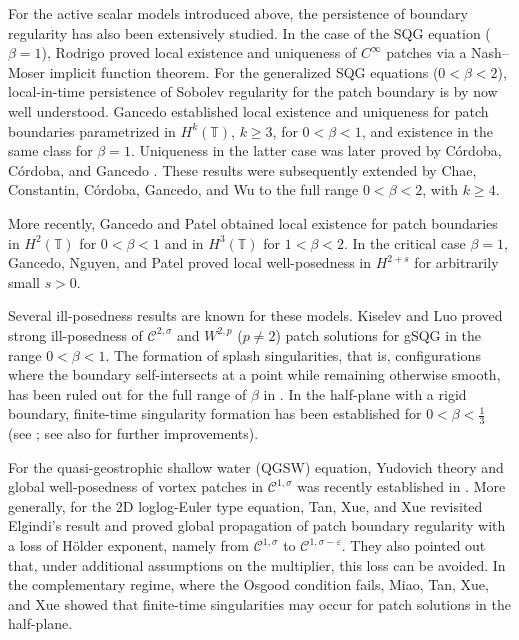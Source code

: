 \documentclass[a4paper]{amsart}
\theoremstyle{definition}
\newcommand{\T}{\ensuremath{\mathbb{T}}}
\newcommand{\Lipa}[1][\gamma]{\ensuremath{\mathcal{C}^#1}}
\newcommand{\LipUa}[1][\gamma]{\ensuremath{\Lipa[{{1,#1}}]}}
\begin{document}
For the active scalar models introduced above, the persistence of boundary regularity has also been extensively studied. In the case of the SQG equation (\(\beta=1\)), Rodrigo \cite{rodrigo2005} proved local existence and uniqueness of \(C^\infty\) patches via a Nash--Moser implicit function theorem. For the generalized SQG equations (\(0<\beta<2\)), local-in-time persistence of Sobolev regularity for the patch boundary is by now well understood. Gancedo \cite{gancedo2008SQG} established local existence and uniqueness for patch boundaries parametrized in \(H^k(\T)\), \(k \geq 3\), for \(0<\beta<1\), and existence in the same class for \(\beta=1\). Uniqueness in the latter case was later proved by Córdoba, Córdoba, and Gancedo \cite{GancedoUniquenessSQG}. These results were subsequently extended by Chae, Constantin, Córdoba, Gancedo, and Wu \cite{chae2012generalized} to the full range \(0<\beta<2\), with \(k \geq 4\).

More recently, Gancedo and Patel \cite{gancedo2021local} obtained local existence for patch boundaries in \(H^2(\T)\) for \(0<\beta<1\) and in \(H^3(\T)\) for \(1<\beta<2\). In the critical case \(\beta=1\), Gancedo, Nguyen, and Patel \cite{GNP22} proved local well-posedness in \(H^{2+s}\) for arbitrarily small \(s>0\).

Several ill-posedness results are known for these models. Kiselev and Luo \cite{kiselevLuoAlphaSQG} proved strong ill-posedness of \(\mathcal{C}^{2,\sigma}\) and \(W^{2,p}\) (\(p\neq2\)) patch solutions for gSQG in the range \(0<\beta<1\). The formation of splash singularities, that is, configurations where the boundary self-intersects at a point while remaining otherwise smooth, has been ruled out for the full range of \(\beta\) in \cite{GS14, KLSplash23, MR4736524}. In the half-plane with a rigid boundary, finite-time singularity formation has been established for \(0<\beta<\tfrac{1}{3}\) (see \cite{MR3549626, MR3666567, gancedo2021local}; see also \cite{MR4993809} for further improvements).

For the quasi-geostrophic shallow water (QGSW) equation, Yudovich theory and global well-posedness of vortex patches in \(\LipUa[\sigma]\) was recently established in \cite{magana2026QGSW}. More generally, for the 2D loglog-Euler type equation, Tan, Xue, and Xue \cite{TXX2025} revisited Elgindi’s result \cite{MR3158812} and proved global propagation of patch boundary regularity with a loss of Hölder exponent, namely from \(\LipUa[\sigma]\) to \(\mathcal{C}^{1,\sigma-\varepsilon}\). They also pointed out that, under additional assumptions on the multiplier, this loss can be avoided. In the complementary regime, where the Osgood condition fails, Miao, Tan, Xue, and Xue \cite{MiaoTanXueXue2024} showed that finite-time singularities may occur for patch solutions in the half-plane.
\end{document}
